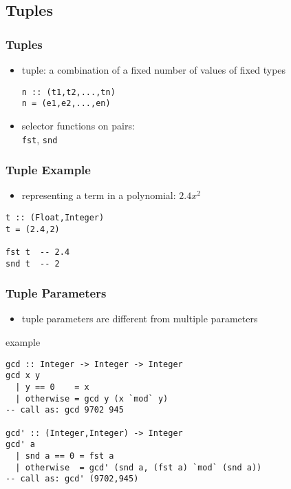 \documentclass[dvipsnames]{beamer}
\theoremstyle{plain}
\begin{document}
\subsection{Tuples}

\begin{frame}[fragile]
  \frametitle{Tuples}

  \begin{itemize}
    \item \alert{tuple}: a combination of a fixed number of values
      of fixed types
      \smallskip
      \begin{lstlisting}
n :: (t1,t2,...,tn)
n = (e1,e2,...,en)
      \end{lstlisting}

    \medskip
    \item selector functions on pairs:\\
      \lstinline{fst}, \lstinline{snd}
  \end{itemize}
\end{frame}

\begin{frame}[fragile]
  \frametitle{Tuple Example}

  \begin{itemize}
    \item representing a term in a polynomial: $2.4x^2$
  \end{itemize}

  \medskip
  \begin{lstlisting}
t :: (Float,Integer)
t = (2.4,2)

fst t  -- 2.4
snd t  -- 2
  \end{lstlisting}
\end{frame}

\begin{frame}[fragile]
  \frametitle{Tuple Parameters}

  \begin{itemize}
    \item tuple parameters are different from multiple parameters
  \end{itemize}

  \begin{exampleblock}{example}
    \begin{lstlisting}
gcd :: Integer -> Integer -> Integer
gcd x y
  | y == 0    = x
  | otherwise = gcd y (x `mod` y)
-- call as: gcd 9702 945

gcd' :: (Integer,Integer) -> Integer
gcd' a
  | snd a == 0 = fst a
  | otherwise  = gcd' (snd a, (fst a) `mod` (snd a))
-- call as: gcd' (9702,945)
    \end{lstlisting}
  \end{exampleblock}
\end{frame}
\end{document}
